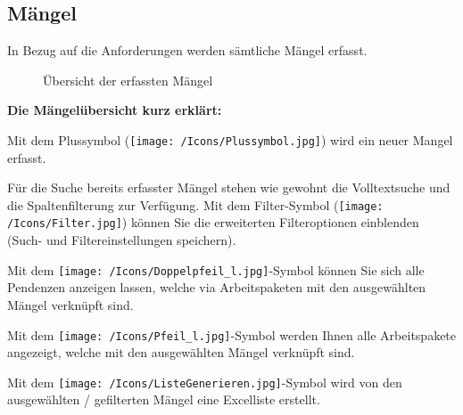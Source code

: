 


\subsection{Mängel}

In Bezug auf die Anforderungen werden sämtliche Mängel erfasst. 

\begin{figure}[H]
\caption{Übersicht der erfassten Mängel}
\end{figure}

\textbf{Die Mängelübersicht kurz erklärt:}

\vspace{\baselineskip}

\begin{compactitem}
	\item Mit dem Plussymbol (\texttt{[image: /Icons/Plussymbol.jpg]}) wird ein neuer Mangel erfasst. 
	\item Für die Suche bereits erfasster Mängel stehen wie gewohnt die Volltextsuche und die Spaltenfilterung zur Verfügung. Mit dem Filter-Symbol (\texttt{[image: /Icons/Filter.jpg]}) können Sie die erweiterten Filteroptionen einblenden (Such- und Filtereinstellungen speichern).
	\item Mit dem \texttt{[image: /Icons/Doppelpfeil\_l.jpg]}-Symbol können Sie sich alle Pendenzen anzeigen lassen, welche via Arbeitspaketen mit den ausgewählten Mängel verknüpft sind.
	\item Mit dem \texttt{[image: /Icons/Pfeil\_l.jpg]}-Symbol werden Ihnen alle Arbeitspakete angezeigt, welche mit den ausgewählten Mängel verknüpft sind.
	\item Mit dem \texttt{[image: /Icons/ListeGenerieren.jpg]}-Symbol wird von den ausgewählten / gefilterten Mängel eine Excelliste erstellt.
\end{compactitem}

